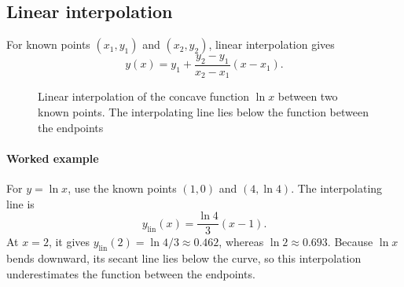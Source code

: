 \subsection{Linear interpolation}
\label{math:interpolation}

For known points $(x_1,y_1)$ and $(x_2,y_2)$, linear interpolation gives
\[
    y(x)=y_1+\frac{y_2-y_1}{x_2-x_1}(x-x_1).
\]

\begin{figure}[ht]
    \centering
    \caption{Linear interpolation of the concave function $\ln x$ between two known points. The interpolating line lies below the function between the endpoints}
    \label{fig:linear-interpolation}
\end{figure}

\paragraph{Worked example}
For $y=\ln x$, use the known points $(1,0)$ and $(4,\ln4)$.
The interpolating line is
\[
    y_{\mathrm{lin}}(x)=\frac{\ln4}{3}(x-1).
\]
At $x=2$, it gives $y_{\mathrm{lin}}(2)=\ln4/3\approx0.462$, whereas $\ln2\approx0.693$.
Because $\ln x$ bends downward, its secant line lies below the curve, so this interpolation underestimates the function between the endpoints.
